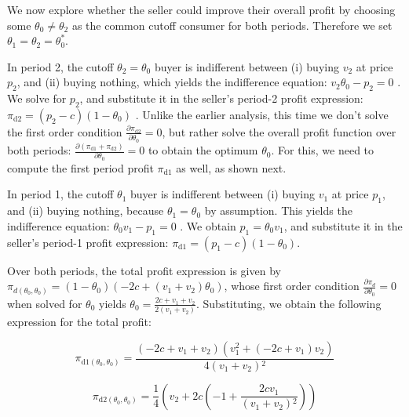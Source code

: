 \documentclass{article}
\begin{document}
We now explore whether the seller could improve their overall profit by choosing some \(\theta _0\neq \theta _2\) as the common cutoff consumer for
both periods. Therefore we set \(\theta _1=\theta _2=\theta _0^*\).

In period 2, the cutoff \(\theta _2=\theta _0\) buyer is indifferent between (i) buying \(v_2\) at price \(p_2\), and (ii) buying nothing, which
yields the indifference equation: \(v_2 \theta _0-p_2 = 0\) . We solve for \(p_2\), and substitute it in the seller{'}s period-2 profit expression:
\(\pi _{\text{d2}}=\left(p_2-c\right)\left(1-\theta _0\right)\) . Unlike the earlier analysis, this time we don{'}t solve the first order condition
\(\frac{\partial \pi _{\text{d2}}}{\partial \theta _0}=0\), but rather solve the overall profit function over both periods: \(\frac{\partial \left(\pi
_{\text{d1}}+\pi _{\text{d2}}\right)}{\partial \theta _0}=0\) to obtain the optimum \(\theta _0\). For this, we need to compute the first period
profit \(\pi _{\text{d1}}\) as well, as shown next.

In period 1, the cutoff \(\theta _1\) buyer is indifferent between (i) buying \(v_1\) at price \(p_1\), and (ii) buying nothing, because \(\theta
_1=\theta _0\) by assumption. This { }yields the indifference equation: \(\theta _0v_1 - p_1 = 0\) . We obtain \(p_1=\theta _0v_1\), and substitute
it in the seller{'}s period-1 profit expression: \(\pi _{\text{d1}}=\left(p_1-c\right)\left(1-\theta _0\right)\).

Over both periods, the total profit expression is given by { }\(\pi _{d\left(\theta _0,\theta _0\right)}=\left(1-\theta _0\right) \left(-2 c+\left(v_1+v_2\right)
\theta _0\right)\), whose first order condition \(\frac{\partial \pi _d}{\partial \theta _0}=0\) when solved for \(\theta _0\) yields \(\theta _0=\frac{2
c+v_1+v_2}{2 \left(v_1+v_2\right)}\). Substituting, we obtain the following expression for the total profit:

\begin{equation}
\pi _{\text{d1}\left(\theta _0,\theta _0\right)}=\frac{\left(-2 c+v_1+v_2\right) \left(v_1^2+\left(-2 c+v_1\right) v_2\right)}{4 \left(v_1+v_2\right){}^2}
\end{equation}

\begin{equation}
\pi _{\text{d2}\left(\theta _0,\theta _0\right)}=\frac{1}{4} \left(v_2+2 c \left(-1+\frac{2 c v_1}{\left(v_1+v_2\right){}^2}\right)\right)
\end{equation}
\end{document}
